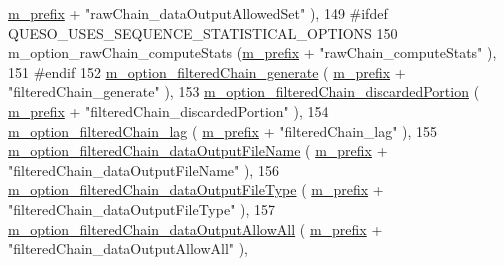 \begin{DoxyCode}
      \hyperlink{class_q_u_e_s_o_1_1_m_l_sampling_level_options_a4423067de3fa689d820abeba4dc5babc}{m\_prefix} + \textcolor{stringliteral}{"rawChain\_dataOutputAllowedSet"}             ),
149 \textcolor{preprocessor}{#ifdef QUESO\_USES\_SEQUENCE\_STATISTICAL\_OPTIONS}
150 \textcolor{preprocessor}{}  m\_option\_rawChain\_computeStats                     (\hyperlink{class_q_u_e_s_o_1_1_m_l_sampling_level_options_a4423067de3fa689d820abeba4dc5babc}{m\_prefix} + \textcolor{stringliteral}{"rawChain\_computeStats"}           
                ),
151 \textcolor{preprocessor}{#endif}
152 \textcolor{preprocessor}{}  \hyperlink{class_q_u_e_s_o_1_1_m_l_sampling_level_options_a889952cbad52c41c179ff6ffecf82dd7}{m\_option\_filteredChain\_generate}                    (
      \hyperlink{class_q_u_e_s_o_1_1_m_l_sampling_level_options_a4423067de3fa689d820abeba4dc5babc}{m\_prefix} + \textcolor{stringliteral}{"filteredChain\_generate"}                    ),
153   \hyperlink{class_q_u_e_s_o_1_1_m_l_sampling_level_options_aa1d2bc1ba487c867b5ab68748f1e6c55}{m\_option\_filteredChain\_discardedPortion}            (
      \hyperlink{class_q_u_e_s_o_1_1_m_l_sampling_level_options_a4423067de3fa689d820abeba4dc5babc}{m\_prefix} + \textcolor{stringliteral}{"filteredChain\_discardedPortion"}            ),
154   \hyperlink{class_q_u_e_s_o_1_1_m_l_sampling_level_options_a52e58ef7b6d840b8c6f7d505ba9cf1b2}{m\_option\_filteredChain\_lag}                         (
      \hyperlink{class_q_u_e_s_o_1_1_m_l_sampling_level_options_a4423067de3fa689d820abeba4dc5babc}{m\_prefix} + \textcolor{stringliteral}{"filteredChain\_lag"}                         ),
155   \hyperlink{class_q_u_e_s_o_1_1_m_l_sampling_level_options_af9ec9aa644d0ee22a42a2aa7fdf49218}{m\_option\_filteredChain\_dataOutputFileName}          (
      \hyperlink{class_q_u_e_s_o_1_1_m_l_sampling_level_options_a4423067de3fa689d820abeba4dc5babc}{m\_prefix} + \textcolor{stringliteral}{"filteredChain\_dataOutputFileName"}          ),
156   \hyperlink{class_q_u_e_s_o_1_1_m_l_sampling_level_options_a39e79ec1b87802ecd32bf4999908ecbf}{m\_option\_filteredChain\_dataOutputFileType}          (
      \hyperlink{class_q_u_e_s_o_1_1_m_l_sampling_level_options_a4423067de3fa689d820abeba4dc5babc}{m\_prefix} + \textcolor{stringliteral}{"filteredChain\_dataOutputFileType"}          ),
157   \hyperlink{class_q_u_e_s_o_1_1_m_l_sampling_level_options_a87338f130d6059b62643ad609f26bfb6}{m\_option\_filteredChain\_dataOutputAllowAll}          (
      \hyperlink{class_q_u_e_s_o_1_1_m_l_sampling_level_options_a4423067de3fa689d820abeba4dc5babc}{m\_prefix} + \textcolor{stringliteral}{"filteredChain\_dataOutputAllowAll"}          ),

\end{DoxyCode}
